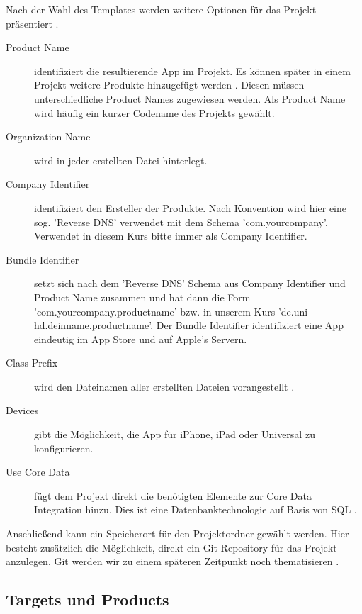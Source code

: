 \documentclass[parskip=half, final]{scrreprt}
\begin{document}

Nach der Wahl des Templates werden weitere Optionen für das Projekt präsentiert .


\begin{description}
\item[Product Name] identifiziert die resultierende App im Projekt. Es können später in einem Projekt weitere Produkte hinzugefügt werden . Diesen müssen unterschiedliche Product Names zugewiesen werden. Als Product Name wird häufig ein kurzer Codename des Projekts gewählt.
\item[Organization Name] wird in jeder erstellten Datei hinterlegt.
\item[Company Identifier] identifiziert den Ersteller der Produkte. Nach Konvention wird hier eine sog. 'Reverse DNS' verwendet mit dem Schema 'com.yourcompany'. Verwendet in diesem Kurs bitte immer  als Company Identifier.
\item[Bundle Identifier] setzt sich nach dem 'Reverse DNS' Schema aus Company Identifier und Product Name zusammen und hat dann die Form 'com.yourcompany.productname' bzw. in unserem Kurs 'de.uni-hd.deinname.productname'. Der Bundle Identifier identifiziert eine App eindeutig im App Store und auf Apple's Servern.
\item[Class Prefix] wird den Dateinamen aller erstellten Dateien vorangestellt .
\item[Devices] gibt die Möglichkeit, die App für iPhone, iPad oder Universal zu konfigurieren.
\item[Use Core Data] fügt dem Projekt direkt die benötigten Elemente zur Core Data Integration hinzu. Dies ist eine Datenbanktechnologie auf Basis von SQL .
\end{description}

Anschließend kann ein Speicherort für den Projektordner gewählt werden. Hier besteht zusätzlich die Möglichkeit, direkt ein Git Repository für das Projekt anzulegen. Git werden wir zu einem späteren Zeitpunkt noch thematisieren .

\subsection{Targets und Products}\label{sec:targets}
\end{document}
